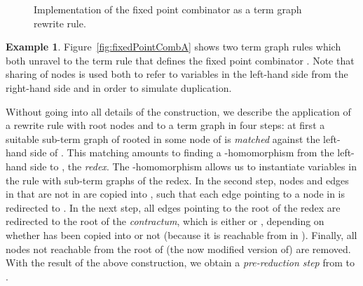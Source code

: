 \documentclass[copyright,creativecommons,UKenglish,final]{eptcs}
\theoremstyle{definition}
\newtheorem{example}{Example}[section]
\theoremstyle{plain}
\begin{document}
\begin{figure}
{
  }\caption{Implementation of the fixed point combinator as a term
    graph rewrite rule.}
  \label{fig:fixedPointComb}
\end{figure}

\begin{example}
  \label{ex:fixedPointCombRules}
  Figure~\ref{fig:fixedPointCombA} shows two term graph rules which
  both unravel to the term rule 
  that defines the fixed point combinator . Note that sharing of
  nodes is used both to refer to variables in the left-hand side from
  the right-hand side and in order to simulate duplication.
\end{example}


Without going into all details of the construction, we describe the
application of a rewrite rule  with root nodes  and  to a
term graph  in four steps: at first a suitable sub-term graph of
 rooted in some node  of  is \emph{matched} against the
left-hand side of . This matching amounts to finding a
-homomorphism  from the left-hand side  to
, the \emph{redex}. The -homomorphism 
allows us to instantiate variables in the rule with sub-term graphs of
the redex. In the second step, nodes and edges in  that are not
in  are copied into , such that each edge pointing to a
node  in  is redirected to . In the next step,
all edges pointing to the root  of the redex are redirected to the
root  of the \emph{contractum}, which is either  or ,
depending on whether  has been copied into  or not (because it
is reachable from  in ). Finally, all nodes not reachable
from the root of (the now modified version of)  are removed.  With
 the result of the above construction, we obtain a
\emph{pre-reduction step}  from  to .
\end{document}
